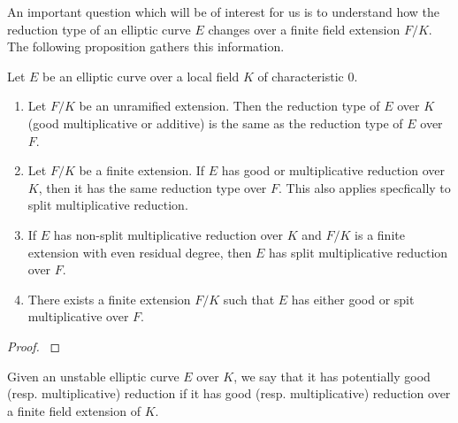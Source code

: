 An important question which will be of interest for us is to understand how the reduction type of an elliptic curve $E$ changes over a finite field extension $F/K$. The following proposition gathers this information.

\begin{prop}\label{prop_semi_red}
    Let $E$ be an elliptic curve over a local field $K$ of characteristic $0$. 
    \begin{enumerate}[label={(\roman*)}]
        \item Let $F/K$ be an unramified extension. Then the reduction type of $E$ over $K$ (good multiplicative or additive) is the same as the reduction type of $E$ over $F$.
        \item Let $F/K$ be a finite extension. If $E$ has good or multiplicative reduction over $K$, then it has the same reduction type over $F$. This also applies specfically to split multiplicative reduction.
        \item If $E$ has non-split multiplicative reduction over $K$ and $F/K$ is a finite extension with even residual degree, then $E$ has split multiplicative reduction over $F$. 
        \item There exists a finite extension $F/K$ such that $E$ has either good or spit multiplicative over $F$.
    \end{enumerate}
\end{prop}
\begin{proof}
    \cite[\S VII Proposition 5.4]{S1} 
\end{proof}

Given an unstable elliptic curve $E$ over $K$, we say that it has potentially good (resp. multiplicative) reduction if it has good (resp. multiplicative) reduction over a finite field extension of $K$.
